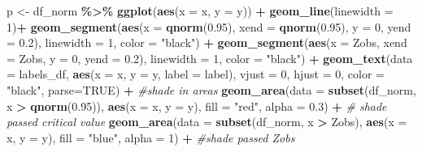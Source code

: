 \documentclass[
]{article}
\newenvironment{Shaded}{\begin{snugshade}}{\end{snugshade}}
\newcommand{\AttributeTok}[1]{\textcolor[rgb]{0.13,0.29,0.53}{#1}}
\newcommand{\CommentTok}[1]{\textcolor[rgb]{0.56,0.35,0.01}{\textit{#1}}}
\newcommand{\ConstantTok}[1]{\textcolor[rgb]{0.56,0.35,0.01}{#1}}
\newcommand{\DecValTok}[1]{\textcolor[rgb]{0.00,0.00,0.81}{#1}}
\newcommand{\FloatTok}[1]{\textcolor[rgb]{0.00,0.00,0.81}{#1}}
\newcommand{\FunctionTok}[1]{\textcolor[rgb]{0.13,0.29,0.53}{\textbf{#1}}}
\newcommand{\NormalTok}[1]{#1}
\newcommand{\OtherTok}[1]{\textcolor[rgb]{0.56,0.35,0.01}{#1}}
\newcommand{\SpecialCharTok}[1]{\textcolor[rgb]{0.81,0.36,0.00}{\textbf{#1}}}
\newcommand{\StringTok}[1]{\textcolor[rgb]{0.31,0.60,0.02}{#1}}
\begin{document}
\begin{Shaded}
\begin{Highlighting}[]
\NormalTok{p }\OtherTok{\textless{}{-}}\NormalTok{ df\_norm }\SpecialCharTok{\%\textgreater{}\%}
      \FunctionTok{ggplot}\NormalTok{(}\FunctionTok{aes}\NormalTok{(}\AttributeTok{x =}\NormalTok{ x, }\AttributeTok{y =}\NormalTok{ y)) }\SpecialCharTok{+}
            \FunctionTok{geom\_line}\NormalTok{(}\AttributeTok{linewidth =} \DecValTok{1}\NormalTok{)}\SpecialCharTok{+}
            \FunctionTok{geom\_segment}\NormalTok{(}\FunctionTok{aes}\NormalTok{(}\AttributeTok{x =} \FunctionTok{qnorm}\NormalTok{(}\FloatTok{0.95}\NormalTok{), }\AttributeTok{xend =} \FunctionTok{qnorm}\NormalTok{(}\FloatTok{0.95}\NormalTok{), }\AttributeTok{y =} \DecValTok{0}\NormalTok{, }\AttributeTok{yend =} \FloatTok{0.2}\NormalTok{),}
               \AttributeTok{linewidth =} \DecValTok{1}\NormalTok{, }\AttributeTok{color =} \StringTok{"black"}\NormalTok{) }\SpecialCharTok{+}
            \FunctionTok{geom\_segment}\NormalTok{(}\FunctionTok{aes}\NormalTok{(}\AttributeTok{x =}\NormalTok{ Zobs, }\AttributeTok{xend =}\NormalTok{ Zobs, }\AttributeTok{y =} \DecValTok{0}\NormalTok{, }\AttributeTok{yend =} \FloatTok{0.2}\NormalTok{),}
               \AttributeTok{linewidth =} \DecValTok{1}\NormalTok{, }\AttributeTok{color =} \StringTok{"black"}\NormalTok{) }\SpecialCharTok{+}
            \FunctionTok{geom\_text}\NormalTok{(}\AttributeTok{data =}\NormalTok{ labels\_df, }\FunctionTok{aes}\NormalTok{(}\AttributeTok{x =}\NormalTok{ x, }\AttributeTok{y =}\NormalTok{ y, }\AttributeTok{label =}\NormalTok{ label), }\AttributeTok{vjust =} \DecValTok{0}\NormalTok{, }\AttributeTok{hjust =} \DecValTok{0}\NormalTok{, }\AttributeTok{color =} \StringTok{"black"}\NormalTok{, }\AttributeTok{parse=}\ConstantTok{TRUE}\NormalTok{) }\SpecialCharTok{+}
    \CommentTok{\#shade in areas}
   \FunctionTok{geom\_area}\NormalTok{(}\AttributeTok{data =} \FunctionTok{subset}\NormalTok{(df\_norm, x }\SpecialCharTok{\textgreater{}} \FunctionTok{qnorm}\NormalTok{(}\FloatTok{0.95}\NormalTok{)), }\FunctionTok{aes}\NormalTok{(}\AttributeTok{x =}\NormalTok{ x, }\AttributeTok{y =}\NormalTok{ y), }\AttributeTok{fill =} \StringTok{"red"}\NormalTok{, }\AttributeTok{alpha =} \FloatTok{0.3}\NormalTok{) }\SpecialCharTok{+}   \CommentTok{\# shade passed critical value}
   \FunctionTok{geom\_area}\NormalTok{(}\AttributeTok{data =} \FunctionTok{subset}\NormalTok{(df\_norm, x }\SpecialCharTok{\textgreater{}}\NormalTok{ Zobs), }\FunctionTok{aes}\NormalTok{(}\AttributeTok{x =}\NormalTok{ x, }\AttributeTok{y =}\NormalTok{ y), }\AttributeTok{fill =} \StringTok{"blue"}\NormalTok{, }\AttributeTok{alpha =} \DecValTok{1}\NormalTok{) }\SpecialCharTok{+}     \CommentTok{\#shade passed Zobs}

\end{Highlighting}
\end{Shaded}
\end{document}
